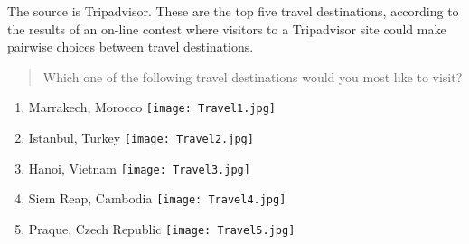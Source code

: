 
The source is Tripadvisor.
These are the top five travel destinations, according to the results of an on-line contest where visitors to a Tripadvisor site could make pairwise choices between travel destinations.

\begin{tcolorbox}
\begin{quotation}
Which one of the following travel destinations would you most like to visit?
\end{quotation}

\begin{enumerate}
\item Marrakech, Morocco
\texttt{[image: Travel1.jpg]}

\item Istanbul, Turkey
\texttt{[image: Travel2.jpg]}

\item Hanoi, Vietnam
\texttt{[image: Travel3.jpg]}

\item Siem Reap, Cambodia
\texttt{[image: Travel4.jpg]}

\item Praque, Czech Republic
\texttt{[image: Travel5.jpg]}
\end{enumerate}	
\end{tcolorbox}
